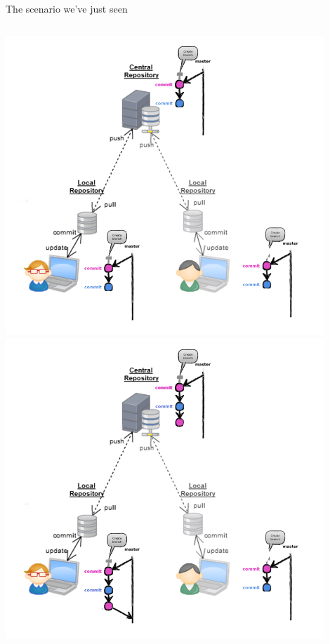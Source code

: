 \begin{frame}[fragile]{The scenario we've just seen}
\begin{columns}
\begin{column}{0.6\textwidth}
\begin{center}
{				\includegraphics[width=0.9\textwidth]{multiuser_pull.png}
			}\only<5> {
				\includegraphics[width=0.9\textwidth]{multiuser_my_merge.png}
			}\only<6> {
}
\end{center}
\end{column}
\end{columns}
\end{frame}
